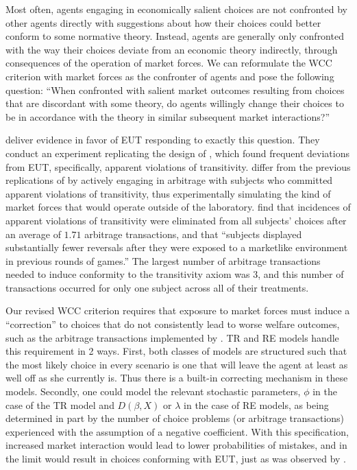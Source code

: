 \documentclass[../main.tex]{subfiles}
\begin{document}
Most often, agents engaging in economically salient choices are not confronted by other agents directly with suggestions about how their choices could better conform to some normative theory.
Instead, agents are generally only confronted with the way their choices deviate from an economic theory indirectly, through consequences of the operation of market forces.
We can reformulate the WCC criterion with market forces as the confronter of agents and pose the following question:
\enquote{When confronted with salient market outcomes resulting from choices that are discordant with some theory, do agents willingly change their choices to be in accordance with the theory in similar subsequent market interactions?}

\textcite{Chu1990} deliver evidence in favor of EUT responding to exactly this question.
They conduct an experiment replicating the design of \textcite{Grether1979}, which found frequent deviations from EUT, specifically, apparent violations of transitivity.{\footnotemark}
\textcite{Chu1990} differ from the previous replications of \textcite{Grether1979} by actively engaging in arbitrage with subjects who committed apparent violations of transitivity, thus experimentally simulating the kind of market forces that would operate outside of the laboratory.
\textcite[910]{Chu1990} find that incidences of apparent violations of transitivity were eliminated from all subjects' choices after an average of $1.71$ arbitrage transactions, and that \enquote{subjects displayed substantially fewer reversals  after they were exposed to a marketlike environment in previous rounds of games.}
The largest number of arbitrage transactions needed to induce conformity to the transitivity axiom was $3$, and this number of transactions occurred for only one subject across all of their treatments.
\addtocounter{footnote}{-1}

Our revised WCC criterion requires that exposure to market forces must induce a \enquote{correction} to choices that do not consistently lead to worse welfare outcomes, such as the arbitrage transactions implemented by \textcite{Chu1990}.
TR and RE models handle this requirement in 2 ways.
First, both classes of models are structured such that the most likely choice in every scenario is one that will leave the agent at least as well off as she currently is.
Thus there is a built-in correcting mechanism in these models.
Secondly, one could model the relevant stochastic parameters, $\phi$ in the case of the TR model and $D(\beta,X)$ or $\lambda$ in the case of RE models, as being determined in part by the number of choice problems (or arbitrage transactions) experienced with the assumption of a negative coefficient.
With this specification, increased market interaction would lead to lower probabilities of mistakes, and in the limit would result in choices conforming with EUT, just as was observed by \textcite{Chu1990}.
\end{document}
